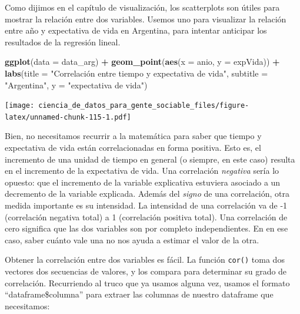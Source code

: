 \documentclass[spanish,]{book}
\newenvironment{Shaded}{\begin{snugshade}}{\end{snugshade}}
\newcommand{\DataTypeTok}[1]{\textcolor[rgb]{0.13,0.29,0.53}{#1}}
\newcommand{\KeywordTok}[1]{\textcolor[rgb]{0.13,0.29,0.53}{\textbf{#1}}}
\newcommand{\NormalTok}[1]{#1}
\newcommand{\OperatorTok}[1]{\textcolor[rgb]{0.81,0.36,0.00}{\textbf{#1}}}
\newcommand{\StringTok}[1]{\textcolor[rgb]{0.31,0.60,0.02}{#1}}
\begin{document}
Como dijimos en el capítulo de visualización, los scatterplots son útiles para mostrar la relación entre dos variables. Usemos uno para visualizar la relación entre año y expectativa de vida en Argentina, para intentar anticipar los resultados de la regresión lineal.

\begin{Shaded}
\begin{Highlighting}[]
\KeywordTok{ggplot}\NormalTok{(}\DataTypeTok{data =}\NormalTok{ data_arg) }\OperatorTok{+}\StringTok{ }
\StringTok{    }\KeywordTok{geom_point}\NormalTok{(}\KeywordTok{aes}\NormalTok{(}\DataTypeTok{x =}\NormalTok{ anio, }\DataTypeTok{y =}\NormalTok{ expVida)) }\OperatorTok{+}
\StringTok{    }\KeywordTok{labs}\NormalTok{(}\DataTypeTok{title =} \StringTok{"Correlación entre tiempo y expectativa de vida"}\NormalTok{,}
         \DataTypeTok{subtitle =} \StringTok{"Argentina"}\NormalTok{,}
         \DataTypeTok{y =} \StringTok{"expectativa de vida"}\NormalTok{)}
\end{Highlighting}
\end{Shaded}

\texttt{[image: ciencia\_de\_datos\_para\_gente\_sociable\_files/figure-latex/unnamed-chunk-115-1.pdf]}

Bien, no necesitamos recurrir a la matemática para saber que tiempo y expectativa de vida están correlacionadas en forma positiva. Esto es, el incremento de una unidad de tiempo en general (o siempre, en este caso) resulta en el incremento de la expectativa de vida. Una correlación \emph{negativa} sería lo opuesto: que el incremento de la variable explicativa estuviera asociado a un decremento de la variable explicada. Además del \emph{signo} de una correlación, otra medida importante es su intensidad. La intensidad de una correlación va de -1 (correlación negativa total) a 1 (correlación positiva total). Una correlación de cero significa que las dos variables son por completo independientes. En en ese caso, saber cuánto vale una no nos ayuda a estimar el valor de la otra.

Obtener la correlación entre dos variables es fácil. La función \texttt{cor()} toma dos vectores dos secuencias de valores, y los compara para determinar su grado de correlación. Recurriendo al truco que ya usamos alguna vez, usamos el formato ``dataframe\$columna'' para extraer las columnas de nuestro dataframe que necesitamos:

\begin{Shaded}
\end{Shaded}
\end{document}

